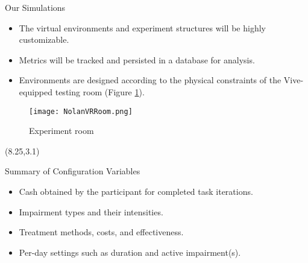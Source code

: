 \documentclass[22pt]{beamer}
\begin{document}
\begin{frame}[fragile]
\begin{textblock}{7.25}
\begin{block}{Our Simulations}\newline
\begin{itemize}
\item The virtual environments and experiment structures will be highly customizable. 
\item Metrics will be tracked and persisted in a database for analysis.
\item Environments are designed according to the physical constraints of the Vive-equipped testing room (Figure \ref{fig:room}).
\end{itemize}
\newline
\begin{figure}
  \texttt{[image: NolanVRRoom.png]}
  \caption{Experiment room}
\label{fig:room}
\end{figure}
\end{block}







\end{textblock}




\begin{textblock}{7.25}(8.25,3.1)

\begin{block}{Summary of Configuration Variables}\newline
\begin{itemize}
\item Cash obtained by the participant for completed task iterations.
\item Impairment types and their intensities.
\item Treatment methods, costs, and effectiveness.
\item Per-day settings such as duration and active impairment(s).
\end{itemize}
\end{block}


\end{textblock}
\end{frame}
\end{document}
